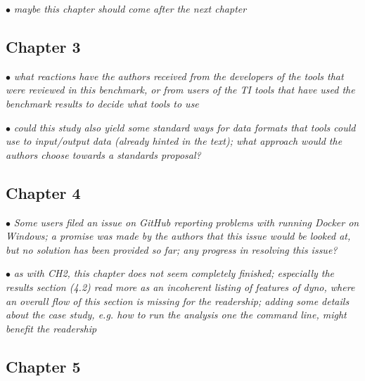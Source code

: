 \documentclass[10pt]{article}
\newcommand{\exam}[2][\  ]{\hspace{0pt}\marginpar{\color{myred}#1}$\bullet$ \textit{#2}}
\begin{document}
\exam{maybe this chapter should come after the next chapter}

\subsection{Chapter 3}

\exam{what reactions have the authors received from the developers of the tools that were reviewed in
	this benchmark, or from users of the TI tools that have used the benchmark results to decide what
	tools to use}

\exam{could this study also yield some standard ways for data formats that tools could use to input/output
	data (already hinted in the text); what approach would the authors choose towards a standards
	proposal?}

\subsection{Chapter 4}

\exam{Some users filed an issue on GitHub reporting problems with running Docker on Windows; a
	promise was made by the authors that this issue would be looked at, but no solution has been
	provided so far; any progress in resolving this issue?}

\exam{as with CH2, this chapter does not seem completely finished; especially the results section (4.2) read more as an incoherent listing of features of dyno, where an overall flow of this section is missing for the readership; adding some details about the case study, e.g. how to run the analysis one the command line, might benefit the readership}

\subsection{Chapter 5} 
\end{document}
